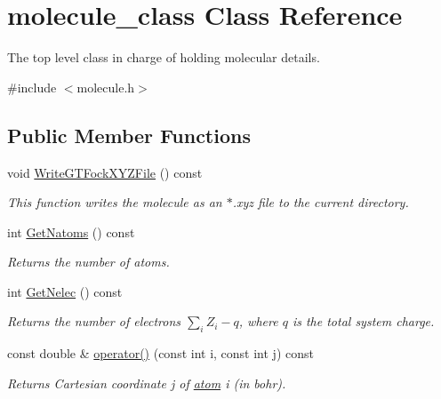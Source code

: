 \hypertarget{classJKBuilder_1_1molecule__class}{
\section{molecule\_\-class Class Reference}
\label{classJKBuilder_1_1molecule__class}
}


The top level class in charge of holding molecular details.  


{\ttfamily \#include $<$molecule.h$>$}\subsection*{Public Member Functions}
\begin{DoxyCompactItemize}
\item 
void \hyperlink{classJKBuilder_1_1molecule__class_a16b721cec672dda3fc1a3c90e3d71120}{WriteGTFockXYZFile} () const 
\begin{DoxyCompactList}\small\item\em This function writes the molecule as an $\ast$.xyz file to the current directory. \item\end{DoxyCompactList}\item 
int \hyperlink{classJKBuilder_1_1molecule__class_abb0ac82b97b1f6476539eb2b712bbceb}{GetNatoms} () const 
\begin{DoxyCompactList}\small\item\em Returns the number of atoms. \item\end{DoxyCompactList}\item 
int \hyperlink{classJKBuilder_1_1molecule__class_aeb29d9144c99d302f7b43d5398929ea5}{GetNelec} () const 
\begin{DoxyCompactList}\small\item\em Returns the number of electrons $\sum_i Z_i-q$, where $q$ is the total system charge. \item\end{DoxyCompactList}\item 
const double \& \hyperlink{classJKBuilder_1_1molecule__class_a9ccbac42f4eefb704f04886001f4fb3e}{operator()} (const int i, const int j) const 
\begin{DoxyCompactList}\small\item\em Returns Cartesian coordinate j of \hyperlink{classJKBuilder_1_1atom}{atom} i (in bohr). \item\end{DoxyCompactList}\item 

\end{DoxyCompactItemize}
